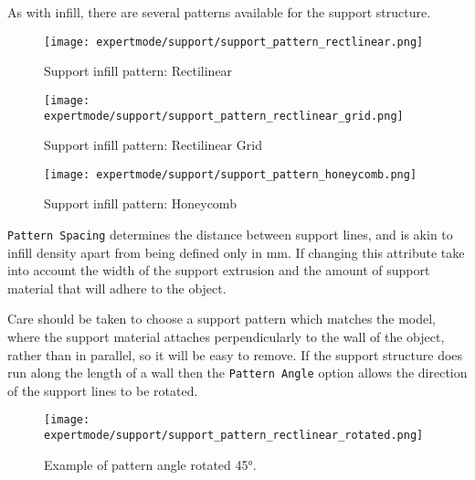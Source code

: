 As with infill, there are several patterns available for the support structure.

\begin{figure}[H]
\centering
\texttt{[image: expertmode/support/support\_pattern\_rectlinear.png]}
\caption{Support infill pattern: Rectilinear}
\label{fig:support_pattern_rectlinear}
\end{figure}

\begin{figure}[H]
\centering
\texttt{[image: expertmode/support/support\_pattern\_rectlinear\_grid.png]}
\caption{Support infill pattern: Rectilinear Grid}
\label{fig:support_pattern_rectlinear_grid}
\end{figure}

\begin{figure}[H]
\centering
\texttt{[image: expertmode/support/support\_pattern\_honeycomb.png]}
\caption{Support infill pattern: Honeycomb}
\label{fig:support_pattern_honeycomb}
\end{figure}

\texttt{Pattern Spacing} determines the distance between support lines, and is akin to infill density apart from being defined only in mm.  If changing this attribute take into account the width of the support extrusion and the amount of support material that will adhere to the object.

Care should be taken to choose a support pattern which matches the model, where the support material attaches perpendicularly to the wall of the object, rather than in parallel, so it will be easy to remove.  If the support structure does run along the length of a wall then the \texttt{Pattern Angle} option allows the direction of the support lines to be rotated.

\begin{figure}[H]
\centering
\texttt{[image: expertmode/support/support\_pattern\_rectlinear\_rotated.png]}
\caption{Example of pattern angle rotated 45°.}
\label{fig:support_pattern_rectlinear_rotated}
\end{figure}




